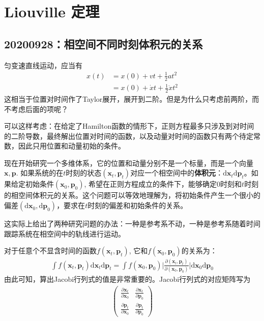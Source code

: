 \chapter{Liouville 定理}
    \section{20200928：相空间不同时刻体积元的关系}
    匀变速直线运动，应当有
    \begin{align*}
        x(t) &= x(0) + vt + \frac 12 at^2\\
        &= x(0) + \dot{x}t + \frac 12 \ddot{x}t^2
    \end{align*}
    这相当于位置对时间作了Taylor展开，展开到二阶。但是为什么只考虑前两阶，而不考虑后面的项呢？

    可以这样考虑：在给定了Hamilton函数的情形下，正则方程最多只涉及到对时间的二阶导数，最终解出位置对时间的函数，以及动量对时间的函数只有两个待定常数，因此只用位置和动量初始的条件。

    现在开始研究一个多维体系，它的位置和动量分别不是一个标量，而是一个向量$\bm{x}, \bm{p}$. 如果系统的在$t$时刻的状态$(\bm{x}_t,\bm{p}_t)$对应一个相空间中的\textbf{体积元}：$\mathrm{d}\bm{x}_t\mathrm{d}\bm{p}_t$。如果给定初始条件$(\bm{x}_0,\bm{p}_0)$, 希望在正则方程成立的条件下，能够确定0时刻和$t$时刻的相空间体积元的关系。这个问题可以等效地理解为，将初始条件产生一个很小的偏差$(\mathrm{d}\bm{x}_0,\mathrm{d}\bm{p}_0)$，要求在$t$时刻的偏差和初始条件的关系。

    这实际上给出了两种研究问题的办法：一种是参考系不动，一种是参考系随着时间跟踪系统在相空间中的轨线进行运动。

    对于任意个不显含时间的函数$f(\bm{x}_t,\bm{p}_t)$, 它和$f(\bm{x}_0,\bm{p}_0)$的关系为：
    \begin{align*}
        \int f(\bm{x}_t,\bm{p}_t) \mathrm{d}\bm{x}_t\mathrm{d}\bm{p}_t = \int f(\bm{x}_0,\bm{p}_0)\bigg|\frac {\partial (\bm{x}_t, \bm{p}_t)}{\partial (\bm{x}_0,\bm{p}_0)}\bigg| \mathrm{d}\bm{x}_0 \mathrm{d}\bm{p}_0
    \end{align*}
    由此可知，算出Jacobi行列式的值是非常重要的。Jacobi行列式的对应矩阵写为
    \begin{align*}
        \begin{pmatrix}
            \frac {\partial \bm{x}_t}{\partial \bm{x}_0} & \frac {\partial \bm{x}_t}{\partial \bm{p}_0}\\
            \frac {\partial \bm{p}_t}{\partial \bm{x}_0} & \frac {\partial \bm{p}_t}{\partial \bm{p}_0}
        \end{pmatrix}
    \end{align*}

